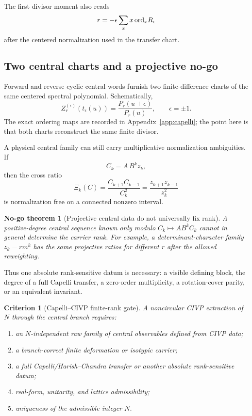 \documentclass[aps,prd,preprint,nofootinbib,superscriptaddress]{revtex4-2}
\newtheorem{criterion}[theorem]{Criterion}
\newtheorem{nogotheorem}[theorem]{No-go theorem}
\theoremstyle{definition}
\theoremstyle{remark}
\begin{document}
The first divisor moment also reads
\begin{equation}
r
=
-\epsilon
\sum_x
x\,{\rm ord}_xR_\epsilon
\label{eq:rankmoment}
\end{equation}
after the centered normalization used in the transfer chart.

\subsection{Two central charts and a projective no-go}

Forward and reverse cyclic central words furnish two finite-difference charts of the same centered spectral polynomial.  Schematically,
\begin{equation}
Z_r^{(\epsilon)}(t_\epsilon(u))
=
\frac{P_r(u+\epsilon)}{P_r(u)},
\qquad
\epsilon=\pm1.
\label{eq:twocharts}
\end{equation}
The exact ordering maps are recorded in Appendix~\ref{app:capelli}; the point here is that both charts reconstruct the same finite divisor.

A physical central family can still carry multiplicative normalization ambiguities.  If
\begin{equation}
C_k=A\,B^k z_k,
\label{eq:centralreweight}
\end{equation}
then the cross ratio
\begin{equation}
\Xi_k(C)
=
\frac{C_{k+1}C_{k-1}}{C_k^2}
=
\frac{z_{k+1}z_{k-1}}{z_k^2}
\label{eq:centralcrossratio}
\end{equation}
is normalization free on a connected nonzero interval.

\begin{nogotheorem}[Projective central data do not universally fix rank]
\label{thm:projectiveranknogo}
A positive-degree central sequence known only modulo $C_k\mapsto A B^k C_k$ cannot in general determine the carrier rank.  For example, a determinant-character family $z_k=r m^k$ has the same projective ratios for different $r$ after the allowed reweighting.
\end{nogotheorem}

Thus one absolute rank-sensitive datum is necessary: a visible defining block, the degree of a full Capelli transfer, a zero-order multiplicity, a rotation-cover parity, or an equivalent invariant.

\begin{criterion}[Capelli--CIVP finite-rank gate]
\label{crit:capelligate}
A noncircular CIVP extraction of $N$ through the central branch requires:
\begin{enumerate}[label=(\roman*)]
\item an $N$-independent raw family of central observables defined from CIVP data;
\item a branch-correct finite deformation or isotypic carrier;
\item a full Capelli/Harish--Chandra transfer or another absolute rank-sensitive datum;
\item real-form, unitarity, and lattice admissibility;
\item uniqueness of the admissible integer $N$.
\end{enumerate}
\end{criterion}
\end{document}
